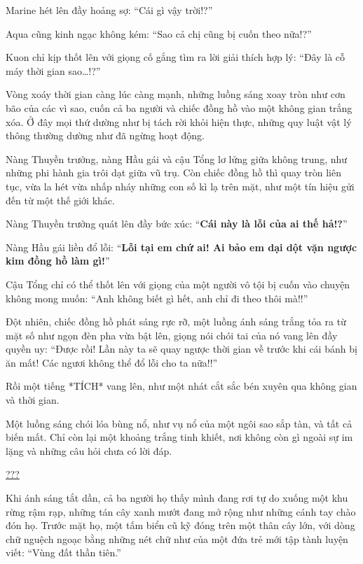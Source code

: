 \documentclass[../main.tex]{subfiles}
\begin{document}
Marine hét lên đầy hoảng sợ: ``Cái gì vậy trời!?''

Aqua cũng kinh ngạc không kém: ``Sao cả chị cũng bị cuốn theo nữa!?''

Kuon chỉ kịp thốt lên với giọng cố gắng tìm ra lời giải thích hợp lý: ``Đây là cỗ máy thời gian sao\dots!?''

Vòng xoáy thời gian càng lúc càng mạnh, những luồng sáng xoay tròn như cơn bão của các vì sao, cuốn cả ba người và chiếc đồng hồ vào một không gian trắng xóa. Ở đây mọi thứ dường như bị tách rời khỏi hiện thực, những quy luật vật lý thông thường dường như đã ngừng hoạt động.

Nàng Thuyền trưởng, nàng Hầu gái và cậu Tổng lơ lửng giữa không trung, như những phi hành gia trôi dạt giữa vũ trụ. Còn chiếc đồng hồ thì quay tròn liên tục, vừa la hét vừa nhấp nháy những con số kì lạ trên mặt, như một tín hiệu gửi đến từ một thế giới khác.

Nàng Thuyền trưởng quát lên đầy bức xúc: ``\textbf{Cái này là lỗi của ai thế hả!?}''

Nàng Hầu gái liền đổ lỗi: ``\textbf{Lỗi tại em chứ ai! Ai bảo em dại dột vặn ngược kim đồng hồ làm gì!}''

Cậu Tổng chỉ có thể thốt lên với giọng của một người vô tội bị cuốn vào chuyện không mong muốn: ``Anh không biết gì hết, anh chỉ đi theo thôi mà!!''

Đột nhiên, chiếc đồng hồ phát sáng rực rỡ, một luồng ánh sáng trắng tỏa ra từ mặt số như ngọn đèn pha vừa bật lên, giọng nói chói tai của nó vang lên đầy quyền uy: ``Được rồi! Lần này ta sẽ quay ngược thời gian về trước khi cái bánh bị ăn mất! Các ngươi không thể đổ lỗi cho ta nữa!!''

Rồi một tiếng *TÍCH* vang lên, như một nhát cắt sắc bén xuyên qua không gian và thời gian.

Một luồng sáng chói lóa bùng nổ, như vụ nổ của một ngôi sao sắp tàn, và tất cả biến mất. Chỉ còn lại một khoảng trắng tinh khiết, nơi không còn gì ngoài sự im lặng và những câu hỏi chưa có lời đáp.

\ct

\begin{center}
  \uline{???}
\end{center}

Khi ánh sáng tắt dần, cả ba người họ thấy mình đang rơi tự do xuống một khu rừng rậm rạp, những tán cây xanh mướt đang mở rộng như những cánh tay chào đón họ. Trước mặt họ, một tấm biển cũ kỹ đóng trên một thân cây lớn, với dòng chữ nguệch ngoạc bằng những nét chữ như của một đứa trẻ mới tập tành luyện viết: ``Vùng đất thần tiên.''
\end{document}
